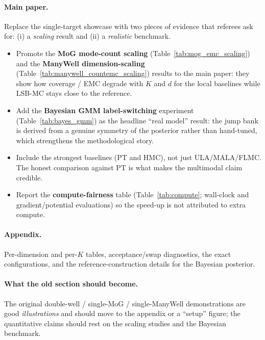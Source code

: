 \paragraph{Main paper.} Replace the single-target showcase with two pieces of
evidence that referees ask for: (i) a \emph{scaling} result and (ii) a
\emph{realistic} benchmark.
\begin{itemize}
\item Promote the \textbf{MoG mode-count scaling}
(Table~\ref{tab:mog_emc_scaling}) and the \textbf{ManyWell dimension-scaling}
(Table~\ref{tab:manywell_countemc_scaling}) results to the main paper: they show
how coverage / EMC degrade with $K$ and $d$ for the local baselines while LSB-MC
stays close to the reference.
\item Add the \textbf{Bayesian GMM label-switching} experiment
(Table~\ref{tab:bayes_gmm}) as the headline ``real model'' result: the jump bank
is derived from a genuine symmetry of the posterior rather than hand-tuned, which
strengthens the methodological story.
\item Include the strongest baselines (PT and HMC), not just ULA/MALA/FLMC. The
honest comparison against PT is what makes the multimodal claim credible.
\item Report the \textbf{compute-fairness} table (Table~\ref{tab:compute};
wall-clock and gradient/potential evaluations) so the speed-up is not attributed
to extra compute.
\end{itemize}

\paragraph{Appendix.} Per-dimension and per-$K$ tables, acceptance/swap
diagnostics, the exact configurations, and the reference-construction details for
the Bayesian posterior.

\paragraph{What the old section should become.} The original double-well /
single-MoG / single-ManyWell demonstrations are good \emph{illustrations} and
should move to the appendix or a ``setup'' figure; the quantitative claims should
rest on the scaling studies and the Bayesian benchmark.
